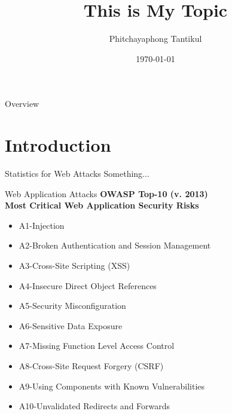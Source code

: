 \documentclass[12pt]{beamer}
\author{Phitchayaphong Tantikul}
\title{This is My Topic}
\institute{Ph.D. student, Faculty of ICT,\\
    Mahidol University\\\vspace{.5em}
    Advisor: ..... \vspace{.5em}}
\date{\today}
\begin{document}
\maketitle

\begin{frame}{Overview}
    \tableofcontents
\end{frame}

\section{Introduction}

\begin{frame}{Statistics for Web Attacks}
    Something...
\end{frame}

\begin{frame}{Web Application Attacks}
    \small
    \textbf{\large OWASP Top-10 (v. 2013)}\\
    \textbf{Most Critical Web Application Security Risks} 
    \begin{itemize}\setlength\itemsep{-0.5em}
        \item A1-Injection
        \item A2-Broken Authentication and Session Management
        \item A3-Cross-Site Scripting (XSS)
        \item A4-Insecure Direct Object References
        \item A5-Security Misconfiguration
        \item A6-Sensitive Data Exposure
        \item A7-Missing Function Level Access Control
        \item A8-Cross-Site Request Forgery (CSRF)
        \item A9-Using Components with Known Vulnerabilities
        \item A10-Unvalidated Redirects and Forwards
    \end{itemize}
\end{frame}
\end{document}
